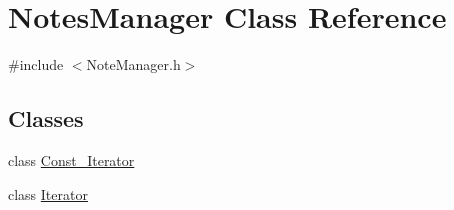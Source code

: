 \hypertarget{classNotesManager}{}\section{Notes\+Manager Class Reference}
\label{classNotesManager}


{\ttfamily \#include $<$Note\+Manager.\+h$>$}

\subsection*{Classes}
\begin{DoxyCompactItemize}
\item 
class \hyperlink{classNotesManager_1_1Const__Iterator}{Const\+\_\+\+Iterator}
\item 
class \hyperlink{classNotesManager_1_1Iterator}{Iterator}
\end{DoxyCompactItemize}
